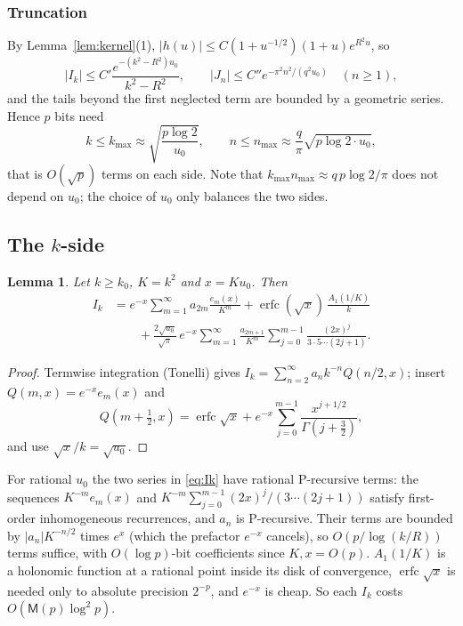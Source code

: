 \documentclass[11pt,reqno]{amsart}
\newtheorem{lemma}[theorem]{Lemma}
\theoremstyle{definition}
\theoremstyle{remark}
\newcommand{\erfc}{\operatorname{erfc}}
\newcommand{\Mul}{\mathsf{M}}
\begin{document}
\subsubsection{Truncation} By Lemma~\ref{lem:kernel}(1), $|h(u)| \le C(1+u^{-1/2})(1+u)e^{R^2u}$, so
\[
  |I_k| \le C' \frac{e^{-(k^2 - R^2)u_0}}{k^2 - R^2}, \qquad
  |J_n| \le C'' e^{-\pi^2n^2/(q^2u_0)} \quad (n \ge 1),
\]
and the tails beyond the first neglected term are bounded by a geometric series. Hence $p$ bits need
\begin{equation}\label{eq:counts}
  k \le k_{\max} \approx \sqrt{\frac{p\log 2}{u_0}}, \qquad n \le n_{\max} \approx \frac{q}{\pi}\sqrt{p\log 2\cdot u_0},
\end{equation}
that is $O(\sqrt p)$ terms on each side. Note that $k_{\max}n_{\max} \approx q\,p\log 2/\pi$ does not
depend on $u_0$; the choice of $u_0$ only balances the two sides.

\subsection{The $k$-side}

\begin{lemma}\label{lem:kside}
Let $k \ge k_0$, $K = k^2$ and $x = Ku_0$. Then
\begin{equation}\label{eq:Ik}
\begin{split}
  I_k &= e^{-x} \sum_{m=1}^{\infty} a_{2m} \frac{e_m(x)}{K^m} + \erfc(\sqrt x)\, \frac{A_1(1/K)}{k} \\
      &\qquad + \frac{2\sqrt{u_0}}{\sqrt\pi}\, e^{-x} \sum_{m=1}^{\infty} \frac{a_{2m+1}}{K^m}
        \sum_{j=0}^{m-1} \frac{(2x)^j}{3\cdot5\cdots(2j+1)} .
\end{split}
\end{equation}
\end{lemma}

\begin{proof}
Termwise integration (Tonelli) gives $I_k = \sum_{n=2}^{\infty} a_n k^{-n}Q(n/2, x)$; insert $Q(m, x) = e^{-x}e_m(x)$ and
\[
  Q(m+\tfrac12, x) = \erfc\sqrt x + e^{-x}\sum_{j=0}^{m-1} \frac{x^{j+1/2}}{\Gamma(j+\frac32)},
\]
and use $\sqrt{x}/k = \sqrt{u_0}$.
\end{proof}

For rational $u_0$ the two series in \eqref{eq:Ik} have rational P-recursive terms: the sequences
$K^{-m}e_m(x)$ and $K^{-m}\sum_{j=0}^{m-1}(2x)^j/(3\cdots(2j+1))$ satisfy first-order inhomogeneous recurrences,
and $a_n$ is P-recursive. Their terms are bounded by $|a_n| K^{-n/2}$ times $e^{x}$ (which the prefactor
$e^{-x}$ cancels), so $O(p/\log(k/R))$ terms suffice, with $O(\log p)$-bit coefficients since $K, x = O(p)$.
$A_1(1/K)$ is a holonomic function at a rational point inside its disk of convergence, $\erfc\sqrt x$ is
needed only to absolute precision $2^{-p}$, and $e^{-x}$ is cheap. So each $I_k$ costs $O(\Mul(p)\log^2p)$.
\end{document}
